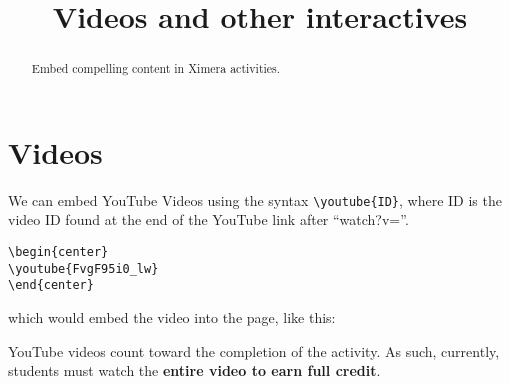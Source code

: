 \documentclass{ximera}
\title{Videos and other interactives}
\begin{document}
\begin{abstract}
  Embed compelling content in Ximera activities.
\end{abstract}
\maketitle

\section{Videos}

We can embed YouTube Videos using the syntax \verb|\youtube{ID}|, where ID
is the video ID found at the end of the YouTube link after ``watch?v=''.
\begin{verbatim}
\begin{center}
\youtube{FvgF95i0_lw}
\end{center}
\end{verbatim}
which would embed the video into the page, like this:
\begin{center}
\end{center}

\begin{warning}
  YouTube videos count toward the completion of the activity. As such,
  currently, students must watch the \textbf{entire video to earn full credit}.
\end{warning}
\end{document}
